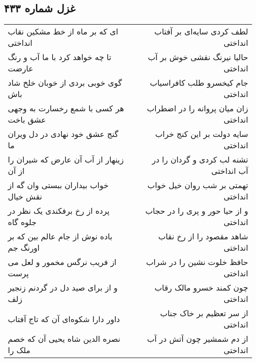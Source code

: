 \begin{center}
\section*{غزل شماره ۴۳۳}
\label{sec:sh433}
\begin{longtable}{l p{0.5cm} r}
ای که بر ماه از خط مشکین نقاب انداختی
&&
لطف کردی سایه‌ای بر آفتاب انداختی
\\
تا چه خواهد کرد با ما آب و رنگ عارضت
&&
حالیا نیرنگ نقشی خوش بر آب انداختی
\\
گوی خوبی بردی از خوبان خلخ شاد باش
&&
جام کیخسرو طلب کافراسیاب انداختی
\\
هر کسی با شمع رخسارت به وجهی عشق باخت
&&
زان میان پروانه را در اضطراب انداختی
\\
گنج عشق خود نهادی در دل ویران ما
&&
سایه دولت بر این کنج خراب انداختی
\\
زینهار از آب آن عارض که شیران را از آن
&&
تشنه لب کردی و گردان را در آب انداختی
\\
خواب بیداران ببستی وان گه از نقش خیال
&&
تهمتی بر شب روان خیل خواب انداختی
\\
پرده از رخ برفکندی یک نظر در جلوه گاه
&&
و از حیا حور و پری را در حجاب انداختی
\\
باده نوش از جام عالم بین که بر اورنگ جم
&&
شاهد مقصود را از رخ نقاب انداختی
\\
از فریب نرگس مخمور و لعل می پرست
&&
حافظ خلوت نشین را در شراب انداختی
\\
و از برای صید دل در گردنم زنجیر زلف
&&
چون کمند خسرو مالک رقاب انداختی
\\
داور دارا شکوه‌ای آن که تاج آفتاب
&&
از سر تعظیم بر خاک جناب انداختی
\\
نصره الدین شاه یحیی آن که خصم ملک را
&&
از دم شمشیر چون آتش در آب انداختی
\\
\end{longtable}
\end{center}
